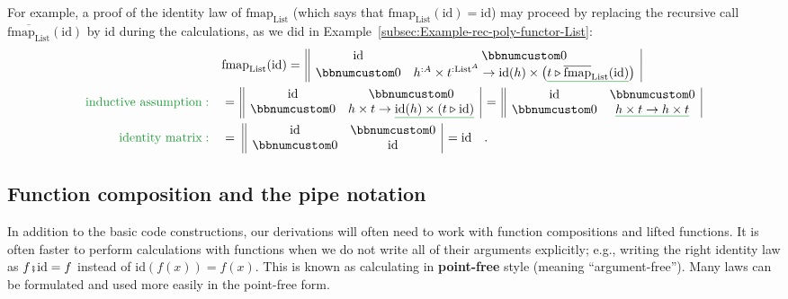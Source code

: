 For example, a proof of the identity law of $\text{fmap}_{\text{List}}$
(which says that $\text{fmap}_{\text{List}}(\text{id})=\text{id}$)
may proceed by replacing the recursive call $\overline{\text{fmap}_{\text{List}}}(\text{id})$
by $\text{id}$ during the calculations, as we did in Example~\ref{subsec:Example-rec-poly-functor-List}:
\begin{align*}
 & \text{fmap}_{\text{List}}(\text{id})=\,\begin{array}{||cc|}
\text{id} & \bbnum 0\\
\bbnum 0 & h^{:A}\times t^{:\text{List}^{A}}\rightarrow\text{id}(h)\times\big(\gunderline{t\triangleright\overline{\text{fmap}}_{\text{List}}(\text{id})}\big)
\end{array}\\
{\color{greenunder}\text{inductive assumption}:}\quad & =\,\begin{array}{||cc|}
\text{id} & \bbnum 0\\
\bbnum 0 & h\times t\rightarrow\gunderline{\text{id}(h)\times(t\triangleright\text{id})}
\end{array}\,=\,\begin{array}{||cc|}
\text{id} & \bbnum 0\\
\bbnum 0 & \gunderline{h\times t\rightarrow h\times t}
\end{array}\\
{\color{greenunder}\text{identity matrix}:}\quad & =\,\,\begin{array}{||cc|}
\text{id} & \bbnum 0\\
\bbnum 0 & \text{id}
\end{array}\,=\text{id}\quad.
\end{align*}


\subsection{Function composition and the pipe notation}

In addition to the basic code constructions, our derivations will
often need to work with function compositions and lifted functions.
It is often faster to perform calculations with functions when we
do not write all of their arguments explicitly; e.g., writing the
right identity law as $f\bef\text{id}=f$ instead of $\text{id}\left(f(x)\right)=f(x)$.
This is known as calculating in \textbf{point-free}
style (meaning \textsf{``}argument-free\textsf{''}). Many laws can be formulated and
used more easily in the point-free form. 

